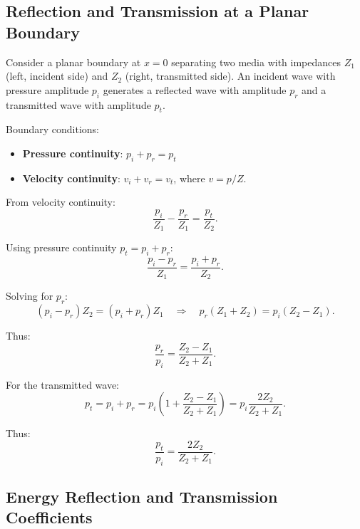 \documentclass[11pt,a4paper]{article}
\theoremstyle{definition}
\theoremstyle{remark}
\begin{document}
\subsection{Reflection and Transmission at a Planar Boundary}
\label{sec:reflection_transmission}

Consider a planar boundary at $x = 0$ separating two media with impedances $Z_1$ (left, incident side) and $Z_2$ (right, transmitted side). An incident wave with pressure amplitude $p_i$ generates a reflected wave with amplitude $p_r$ and a transmitted wave with amplitude $p_t$.

Boundary conditions:
\begin{itemize}[leftmargin=*, itemsep=0.2em]
\item \textbf{Pressure continuity}: $p_i + p_r = p_t$
\item \textbf{Velocity continuity}: $v_i + v_r = v_t$, where $v = p/Z$.
\end{itemize}

From velocity continuity:
\begin{equation}
\frac{p_i}{Z_1} - \frac{p_r}{Z_1} = \frac{p_t}{Z_2}.
\end{equation}

Using pressure continuity $p_t = p_i + p_r$:
\begin{equation}
\frac{p_i - p_r}{Z_1} = \frac{p_i + p_r}{Z_2}.
\end{equation}

Solving for $p_r$:
\begin{equation}
(p_i - p_r)Z_2 = (p_i + p_r)Z_1 \quad \Rightarrow \quad p_r(Z_1 + Z_2) = p_i(Z_2 - Z_1).
\end{equation}

Thus:
\begin{equation}
\label{eq:reflection_coeff_pressure}
\frac{p_r}{p_i} = \frac{Z_2 - Z_1}{Z_2 + Z_1}.
\end{equation}

For the transmitted wave:
\begin{equation}
p_t = p_i + p_r = p_i\left(1 + \frac{Z_2 - Z_1}{Z_2 + Z_1}\right) = p_i\frac{2Z_2}{Z_2 + Z_1}.
\end{equation}

Thus:
\begin{equation}
\label{eq:transmission_coeff_pressure}
\frac{p_t}{p_i} = \frac{2Z_2}{Z_2 + Z_1}.
\end{equation}

\subsection{Energy Reflection and Transmission Coefficients}
\label{sec:energy_coefficients}
\end{document}
